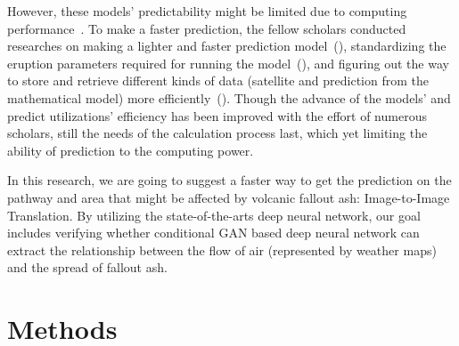 \documentclass{article}
\begin{document}
\begin{doublespacing}
{  However, these models’ predictability might be limited due to computing 
  performance~\citep[p. 745-746]{Tanaka2022}. To make a faster prediction, the fellow scholars 
  conducted researches on making a lighter and faster prediction model~(\citet{Searcy1998}), 
  standardizing the eruption parameters required for running the model~(\citet[p. 7]{Webley2009}), 
  and figuring out the way to store and retrieve different kinds of data (satellite and prediction 
  from the mathematical model) more efficiently~(\citet{Sorokin2016}). Though the advance of the 
  models' and predict utilizations' efficiency has been improved with the effort of numerous 
  scholars, still the needs of the calculation process last, which yet limiting the ability of 
  prediction to the computing power.

  In this research, we are going to suggest a faster way to get the prediction on the pathway and 
  area that might be affected by volcanic fallout ash: Image-to-Image Translation. By utilizing the
  state-of-the-arts deep neural network, our goal includes verifying whether conditional GAN based 
  deep neural network can extract the relationship between the flow of air (represented by weather 
  maps) and the spread of fallout ash.
}

\section{Methods}  %
\fontsize{11pt}{11pt} 
\end{doublespacing}
\end{document}
